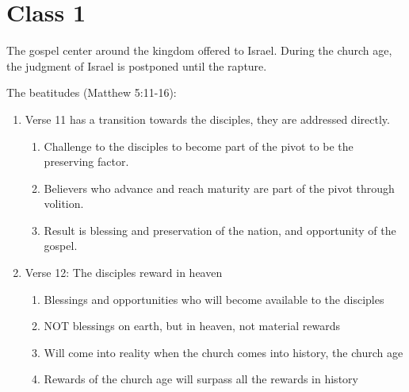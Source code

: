 \documentclass[11pt]{article}
\begin{document}
\maketitle

\section{Class 1}
The gospel center around the kingdom offered to Israel. During the church age, the judgment of Israel is postponed until the rapture.

The beatitudes (Matthew 5:11-16):

\begin{enumerate}
	\item Verse 11 has a transition towards the disciples, they are addressed directly.
	\begin{enumerate}
		\item Challenge to the disciples to become part of the pivot to be the preserving factor.
		\item Believers who advance and reach maturity are part of the pivot through volition.
		\item Result is blessing and preservation of the nation, and opportunity of the gospel.
	\end{enumerate}

	\item Verse 12: The disciples reward in heaven
	\begin{enumerate}
		\item Blessings and opportunities who will become available to the disciples
		\item NOT blessings on earth, but in heaven, not material rewards
		\item Will come into reality when the church comes into history, the church age
		\item Rewards of the church age will surpass all the rewards in history
	\end{enumerate}


\end{enumerate}
\end{document}
